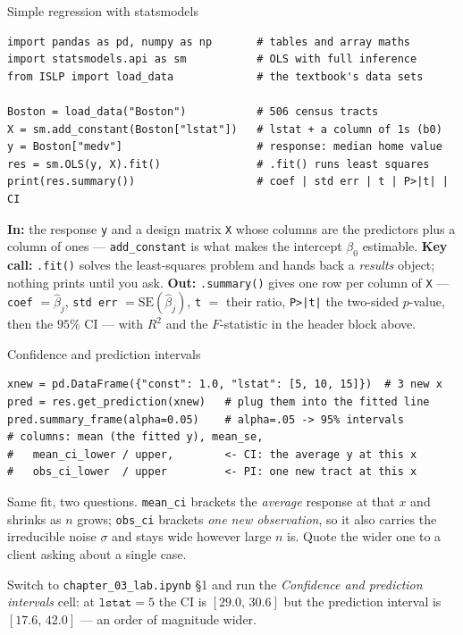 \documentclass[aspectratio=169,11pt]{beamer}
\begin{document}

\begin{frame}[fragile]{Simple regression with statsmodels}
  \begin{lstlisting}
import pandas as pd, numpy as np       # tables and array maths
import statsmodels.api as sm           # OLS with full inference
from ISLP import load_data             # the textbook's data sets

Boston = load_data("Boston")           # 506 census tracts
X = sm.add_constant(Boston["lstat"])   # lstat + a column of 1s (b0)
y = Boston["medv"]                     # response: median home value
res = sm.OLS(y, X).fit()               # .fit() runs least squares
print(res.summary())                   # coef | std err | t | P>|t| | CI
  \end{lstlisting}
  \begin{readme}\footnotesize
    \textbf{In:} the response \texttt{y} and a design matrix \texttt{X}
    whose columns are the predictors plus a column of ones ---
    \texttt{add\_constant} is what makes the intercept $\beta_0$ estimable.
    \textbf{Key call:} \texttt{.fit()} solves the least-squares problem and
    hands back a \emph{results} object; nothing prints until you ask.
    \textbf{Out:} \texttt{.summary()} gives one row per column of
    \texttt{X} --- \texttt{coef} $=\hat\beta_j$, \texttt{std err}
    $=\mathrm{SE}(\hat\beta_j)$, \texttt{t} $=$ their ratio,
    \texttt{P>|t|} the two-sided $p$-value, then the $95\%$ CI --- with
    $R^2$ and the $F$-statistic in the header block above.
  \end{readme}
\end{frame}

\begin{frame}[fragile]{Confidence and prediction intervals}
  \begin{lstlisting}
xnew = pd.DataFrame({"const": 1.0, "lstat": [5, 10, 15]})  # 3 new x
pred = res.get_prediction(xnew)   # plug them into the fitted line
pred.summary_frame(alpha=0.05)    # alpha=.05 -> 95% intervals
# columns: mean (the fitted y), mean_se,
#   mean_ci_lower / upper,        <- CI: the average y at this x
#   obs_ci_lower  / upper         <- PI: one new tract at this x
  \end{lstlisting}
  \begin{readme}\footnotesize
    Same fit, two questions. \texttt{mean\_ci} brackets the \emph{average}
    response at that $x$ and shrinks as $n$ grows; \texttt{obs\_ci} brackets
    \emph{one new observation}, so it also carries the irreducible noise
    $\sigma$ and stays wide however large $n$ is. Quote the wider one to a
    client asking about a single case.
  \end{readme}
  \begin{labnote}
    Switch to \texttt{chapter\_03\_lab.ipynb} \S1 and run the
    \emph{Confidence and prediction intervals} cell: at $\texttt{lstat}=5$
    the CI is $[29.0,\,30.6]$ but the prediction interval is
    $[17.6,\,42.0]$ --- an order of magnitude wider.
  \end{labnote}
\end{frame}
\end{document}
